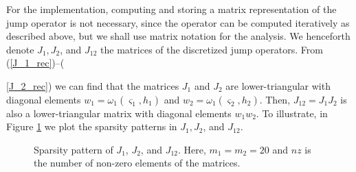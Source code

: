 For the implementation, computing and storing a matrix representation of the jump operator is not necessary, since the operator can be computed iteratively as described above, but we shall use matrix notation for the analysis. We henceforth denote $J_1, J_2$, and $J_{12}$ the matrices of the discretized jump operators. From (\ref{J_1_rec})--({\ref{J_2_rec}) we can find that the matrices $J_1$ and $J_2$ are lower-triangular with diagonal elements $w_1 = \omega_1(\varsigma_1, h_1)$ and $w_2 =  \omega_1(\varsigma_2, h_2)$. Then, $J_{12} = J_1 J_2$ is also a lower-triangular matrix with diagonal elements $w_1 w_2$. To illustrate, in Figure \ref{jump_matrices} we plot the sparsity patterns in $J_1, J_2$, and $J_{12}$.
 \begin{figure}[H]
	\begin{center}
	\end{center}		
	\vspace{-20pt}
	\caption{Sparsity pattern of $J_1$, $J_2$, and $J_{12}$. Here, $m_1=m_2=20$ and $nz$ is the number of non-zero elements of the matrices.}
 	\label{jump_matrices}
\end{figure}

}
